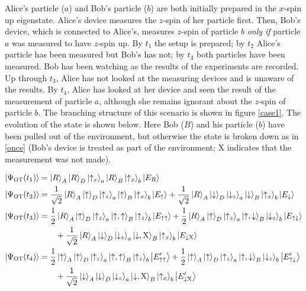 \documentclass[12pt,onecolumn,secnumarabic,amsmath,amssymb,balancelastpage,nofootinbib]{article}
\newcommand{\ket}[1]{\ensuremath{\left|#1\right\rangle}}
\begin{document}
\begin{description}[font=\normalfont\scshape]
\item[Once-or-Twice] Alice's particle ($a$) and Bob's particle ($b$) are both initially prepared in the $x$-spin up eigenstate.  Alice's device measures the $z$-spin of her particle first.  Then, Bob's device, which is connected to Alice's, measures $z$-spin of particle $b$ \emph{only if} particle $a$ was measured to have $z$-spin up.  By $t_1$ the setup is prepared; by $t_2$ Alice's particle has been measured but Bob's has not; by $t_3$ both particles have been measured. Bob has been watching as the results of the experiments are recorded.  Up through $t_3$, Alice has not looked at the measuring devices and is unaware of the results.  By $t_4$, Alice has looked at her device and seen the result of the measurement of particle $a$, although she remains ignorant about the $z$-spin of particle $b$.  The branching structure of this scenario is shown in figure \ref{case1}.  The evolution of the state is shown below.  Here Bob ($B$) and {his }particle {($b$)} have been pulled out of the environment, but otherwise the state is broken down as in \eqref{once} (Bob's device is treated as part of the environment; $\text{X}$ indicates that the measurement was not made).

\begin{align}
\ket{\Psi_{\textsc{OT}}(t_1)}&=\ket{R}_A\ket{R}_{D}\ket{\uparrow_x}_a\ket{R}_B\ket{\uparrow_x}_b\ket{E_{R}}
\nonumber
\\
\ket{\Psi_{\textsc{OT}}(t_2)}&=\frac{1}{\sqrt{2}}\ket{R}_A\ket{\uparrow}_{D}\ket{\uparrow_z}_a\ket{\uparrow}_B\ket{\uparrow_x}_b\ket{E_{\uparrow}}+\frac{1}{\sqrt{2}}\ket{R}_A\ket{\downarrow}_{D}\ket{\downarrow_z}_a\ket{\downarrow}_B\ket{\uparrow_x}_b\ket{E_{\downarrow}}
\nonumber
\\
\ket{\Psi_{\textsc{OT}}(t_3)}&=\frac{1}{2}\ket{R}_A\ket{\uparrow}_{D}\ket{\uparrow_z}_a\ket{\uparrow,\uparrow}_B\ket{\uparrow_z}_b\ket{E_{\uparrow\uparrow}}+\frac{1}{2}\ket{R}_A\ket{\uparrow}_{D}\ket{\uparrow_z}_a\ket{\uparrow,\downarrow}_B\ket{\downarrow_z}_b\ket{E_{\uparrow\downarrow}}
\nonumber
\\
&\qquad +\frac{1}{\sqrt{2}}\ket{R}_A\ket{\downarrow}_{D}\ket{\downarrow_z}_a\ket{\downarrow,\text{X}}_B\ket{\uparrow_x}_b\ket{E_{\downarrow\text{X}}}
\nonumber
\\
\ket{\Psi_{\textsc{OT}}(t_4)}&=\frac{1}{2}\ket{\uparrow}_A\ket{\uparrow}_{D}\ket{\uparrow_z}_a\ket{\uparrow,\uparrow}_B\ket{\uparrow_z}_b\ket{E_{\uparrow\uparrow}'}+\frac{1}{2}\ket{\uparrow}_A\ket{\uparrow}_{D}\ket{\uparrow_z}_a\ket{\uparrow,\downarrow}_B\ket{\downarrow_z}_b\ket{E_{\uparrow\downarrow}'}
\nonumber
\\
&\qquad+\frac{1}{\sqrt{2}}\ket{\downarrow}_A\ket{\downarrow}_{D}\ket{\downarrow_z}_a\ket{\downarrow,\text{X}}_B\ket{\uparrow_x}_b\ket{E_{\downarrow\text{X}}'}
\label{onceortwice}
\end{align}
\end{description}
\end{document}
